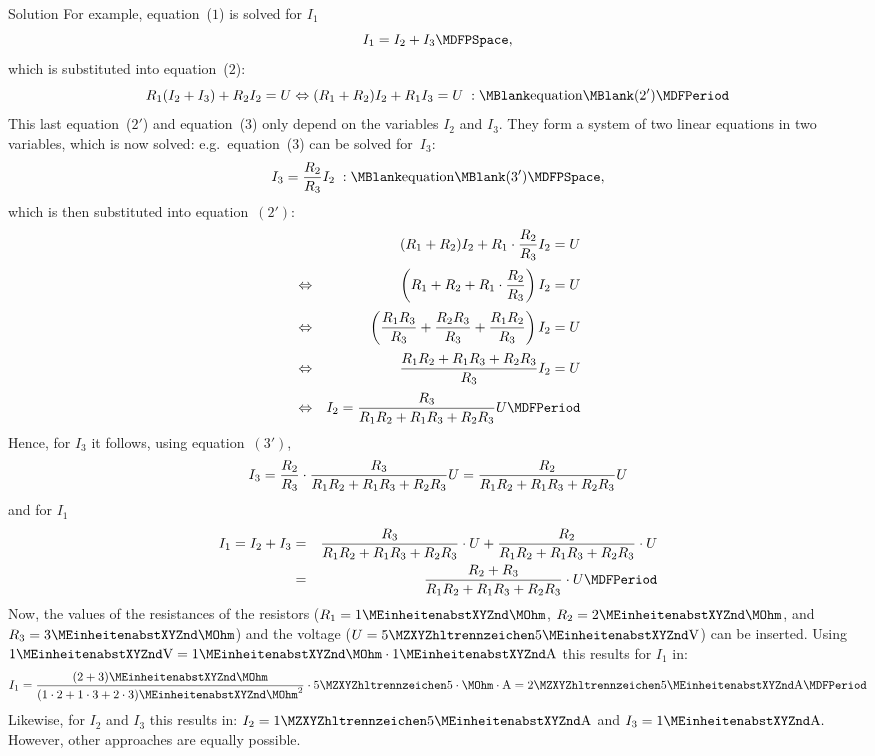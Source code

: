 \begin{MExercises}
\begin{MExercise}
\begin{MHint}{Solution}
For example, equation~($1$) is solved for $I_1$
$$I_1 = I_2 + I_3 \MDFPSpace ,$$
which is substituted into equation~($2$):
$$R_1 (I_2 + I_3) + R_2 I_2 = U \Leftrightarrow (R_1 + R_2) I_2 + R_1 I_3 = U \; : \MBlank\mbox{equation}\MBlank (2') \MDFPeriod$$
This last equation~($2'$) and equation~($3$) only depend on
the variables $I_2$ and $I_3$. They form a system of two linear equations in two variables, 
which is now solved: e.g.\ equation~($3$) can be solved for~$I_3$:
$$I_3 = \Mdfrac{R_2}{R_3} I_2 \; : \MBlank\mbox{equation}\MBlank (3') \MDFPSpace ,$$
which is then substituted into equation~$(2')$:
\begin{eqnarray*}
& & (R_1 + R_2) I_2 + R_1 \cdot \Mdfrac{R_2}{R_3} I_2 = U \\[.5ex]
& \Leftrightarrow & \left( R_1 + R_2 + R_1 \cdot \Mdfrac{R_2}{R_3} \right) I_2 = U \\[.5ex]
& \Leftrightarrow & \left( \Mdfrac{R_1 R_3}{R_3} + \Mdfrac{R_2 R_3}{R_3} + \Mdfrac{R_1 R_2}{R_3} \right) I_2 = U \\[.5ex]
& \Leftrightarrow & \Mdfrac{R_1 R_2 + R_1 R_3 + R_2 R_3}{R_3} I_2 = U \\[.5ex]
& \Leftrightarrow & I_2 = \Mdfrac{R_3}{R_1 R_2 + R_1 R_3 + R_2 R_3} U \MDFPeriod
\end{eqnarray*}
Hence, for $I_3$ it follows, using equation~$(3')$,
$$I_3 = \dfrac{R_2}{R_3} \cdot \dfrac{R_3}{R_1 R_2 + R_1 R_3 + R_2 R_3} U = \dfrac{R_2}{R_1 R_2 + R_1 R_3 + R_2 R_3} U$$
and for $I_1$
\begin{eqnarray*}
  I_1 = I_2 + I_3 &=& \Mdfrac{R_3}{R_1 R_2 + R_1 R_3 + R_2 R_3} \cdot U + \Mdfrac{R_2}{R_1 R_2 + R_1 R_3 + R_2 R_3} \cdot U \\
  &=& \Mdfrac{R_2 + R_3}{R_1 R_2 + R_1 R_3 + R_2 R_3} \cdot U \MDFPeriod
\end{eqnarray*}
Now, the values of the resistances of the resistors ($R_1 = 1\MEinheit{}\MOhm$, 
$R_2 = 2\MEinheit{}\MOhm$, and $R_3 = 3\MEinheit{}\MOhm$) and the voltage 
($U = \MZahl{5}{5}\MEinheit{V}$) can be inserted. Using
$1\MEinheit{V} = 1\MEinheit{}\MOhm \cdot 1\MEinheit{A}$ this results for $I_1$ in:
$$I_1 = \Mdfrac{(2 + 3)\MEinheit{}\MOhm}{(1 \cdot 2 + 1 \cdot 3 + 2 \cdot 3)\MEinheit{}\MOhm^2} \cdot \MZahl{5}{5} \cdot \MOhm \cdot \MEinheit[]{A}
= \MZahl{2}{5}\MEinheit{A} \MDFPeriod$$
Likewise, for $I_2$ and $I_3$ this results in: 
$I_2 = \MZahl{1}{5}\MEinheit{A}$ and $I_3 = 1\MEinheit{A}.$\\
However, other approaches are equally possible.
\end{MHint}
\end{MExercise}


\end{MExercises}
